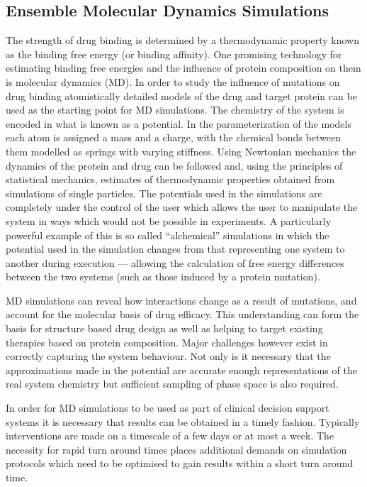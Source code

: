 \subsection{Ensemble Molecular Dynamics Simulations}

The strength of drug binding is determined by a thermodynamic property known
as the binding free energy (or binding affinity). One promising technology for
estimating binding free energies and the influence of protein composition on
them is molecular dynamics (MD). In order to study the influence of mutations
on drug binding atomistically detailed models of the drug and target protein
can be used as the starting point for MD simulations. The chemistry of the
system is encoded in what is known as a potential. \cite{Karplus2002} In the
parameterization of the models each atom is assigned a mass and a charge, with
the chemical bonds between them modelled as springs with varying stiffness.
Using Newtonian mechanics the dynamics of the protein and drug can be followed
and, using the principles of statistical mechanics, estimates of thermodynamic
properties obtained from simulations of single particles. The potentials used
in the simulations are completely under the control of the user which allows
the user to manipulate the system in ways which would not be possible in
experiments. A particularly powerful example of this is so called ``alchemical''
simulations in which the potential used in the simulation changes from that
representing one system to another during execution — allowing the calculation
of free energy differences between the two systems (such as those induced by a
protein mutation).

MD simulations can reveal how interactions change as a result of mutations,
and account for the molecular basis of drug efficacy. This understanding can
form the basis for structure based drug design as well as helping to target
existing therapies based on protein composition. Major challenges however
exist in correctly capturing the system behaviour. Not only is it necessary
that the approximations made in the potential are accurate enough
representations of the real system chemistry but sufficient sampling of phase
space is also required. 

In order for MD simulations to be used as part of clinical decision support
systems it is necessary that results can be obtained in a timely fashion.
Typically interventions are made on a timescale of a few days or at most a
week. 
The necessity for rapid turn around times places additional demands on
simulation protocols which need to be optimised to gain results within a short
turn around time.

